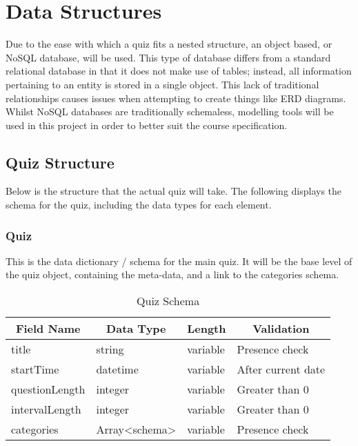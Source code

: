 \section{Data Structures}
Due to the ease with which a quiz fits a nested structure, an object based, or NoSQL database, will be used. This type of database differs from a standard relational database in that it does not make use of tables; instead, all information pertaining to an entity is stored in a single object. This lack of traditional relationships causes issues when attempting to create things like ERD diagrams. Whilst NoSQL databases are traditionally schemaless, modelling tools will be used in this project in order to better suit the course specification.

\subsection{Quiz Structure}
Below is the structure that the actual quiz will take. The following displays the schema for the quiz, including the data types for each element.

\subsubsection{Quiz}
This is the data dictionary / schema for the main quiz. It will be the base level of the quiz object, containing the meta-data, and a link to the categories schema.\\

\begin{table}[!htbp]
\centering
\begin{tabular}{|l|l|l|l|}
\hline
\multicolumn{1}{|c|}{{\bf Field Name}} & \multicolumn{1}{c|}{{\bf Data Type}} & \multicolumn{1}{c|}{{\bf Length}} & \multicolumn{1}{c|}{{\bf Validation}} \\ \hline
title                                  & string                               & variable                          & Presence check                        \\ \hline
startTime                              & datetime                             & variable                          & After current date                    \\ \hline
questionLength                         & integer                              & variable                          & Greater than 0                        \\ \hline
intervalLength                         & integer                              & variable                          & Greater than 0                        \\ \hline
categories                             & Array<schema>                               & variable                          & Presence check                        \\ \hline
\end{tabular}
\caption{Quiz Schema}
\end{table}

